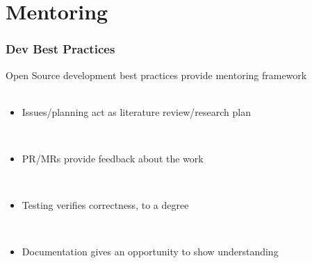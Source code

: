 \documentclass{beamer}
\begin{document}
\section{Mentoring}

\begin{frame}
\begin{center}
\frametitle{Dev Best Practices}

Open Source development best practices provide mentoring framework\\

~\\

\begin{itemize}

\item Issues/planning act as literature review/research plan

~\\

\item PR/MRs provide feedback about the work

~\\

\item Testing verifies correctness, to a degree

~\\

\item Documentation gives an opportunity to show understanding 

\end{itemize}

\end{center}
\end{frame}

\end{document}
